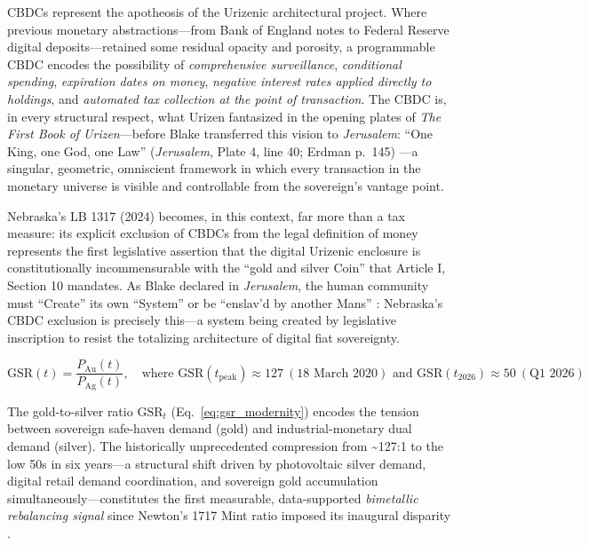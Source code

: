 \documentclass[
]{article}
\begin{document}
CBDCs represent the apotheosis of the Urizenic architectural project.
Where previous monetary abstractions---from Bank of England notes to
Federal Reserve digital deposits---retained some residual opacity and
porosity, a programmable CBDC encodes the possibility of
\emph{comprehensive surveillance}, \emph{conditional spending},
\emph{expiration dates on money}, \emph{negative interest rates applied
directly to holdings}, and \emph{automated tax collection at the point
of transaction}. The CBDC is, in every structural respect, what Urizen
fantasized in the opening plates of \emph{The First Book of
Urizen}---before Blake transferred this vision to \emph{Jerusalem}:
``One King, one God, one Law'' (\emph{Jerusalem}, Plate 4, line 40;
Erdman p.~145) \citep{erdman1988complete}---a singular, geometric,
omniscient framework in which every transaction in the monetary universe
is visible and controllable from the sovereign's vantage point.

Nebraska's LB 1317 (2024) becomes, in this context, far more than a tax
measure: its explicit exclusion of CBDCs from the legal definition of
money represents the first legislative assertion that the digital
Urizenic enclosure is constitutionally incommensurable with the ``gold
and silver Coin'' that Article I, Section 10 mandates. As Blake declared
in \emph{Jerusalem}, the human community must ``Create'' its own
``System'' or be ``enslav'd by another Mans''
\citep{erdman1988complete}: Nebraska's CBDC exclusion is precisely
this---a system being created by legislative inscription to resist the
totalizing architecture of digital fiat sovereignty.

\begin{equation}
\label{eq:gsr_modernity}
\mathrm{GSR}(t) = \frac{P_{\mathrm{Au}}(t)}{P_{\mathrm{Ag}}(t)}, \quad
\text{where } \mathrm{GSR}(t_{\mathrm{peak}}) \approx 127\ (\text{18 March 2020})
\text{ and } \mathrm{GSR}(t_{\mathrm{2026}}) \approx 50\ (\text{Q1 2026})
\end{equation}

The gold-to-silver ratio \(\mathrm{GSR}_t\) (Eq.~\ref{eq:gsr_modernity})
encodes the tension between sovereign safe-haven demand (gold) and
industrial-monetary dual demand (silver). The historically unprecedented
compression from \textasciitilde127:1 to the low 50s in six years---a
structural shift driven by photovoltaic silver demand, digital retail
demand coordination, and sovereign gold accumulation
simultaneously---constitutes the first measurable, data-supported
\emph{bimetallic rebalancing signal} since Newton's 1717 Mint ratio
imposed its inaugural disparity
\citep{silverinstitute2025world, worldgoldcouncil2024demand}.
\end{document}

